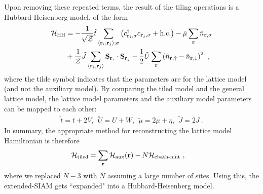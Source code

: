 \documentclass[%
 reprint,
superscriptaddress,
groupedaddress,
 amsmath,amssymb,
 aps,
prl,superscriptaddress
]{revtex4-2}
\begin{document}
Upon removing these repeated terms, the result of the tiling operations is a Hubbard-Heisenberg model, of the form
\begin{equation}\begin{aligned}
	\mathcal{H}_\text{HH} &= -\frac{1}{\sqrt\mathcal{Z}}\tilde t\sum_{\left<{\bf r}_i, {\bf r}_j\right>;\sigma}\left(c^\dagger_{{\bf r}_i,\sigma}c_{{\bf r}_j,\sigma} + \text{h.c.}\right) - \tilde \mu \sum_{{\bf r}}\hat n_{{\bf r},\sigma} \\
    &+ \frac{1}{\mathcal{Z}}\tilde J\sum_{\left< {\bf r}_i, {\bf r}_j\right>}{\bf S}_{{\bf r}_i}\cdot{\bf S}_{{\bf r}_j} - \frac{1}{2}\tilde U\sum_{\bf r}\left(\hat n_{{\bf r} , \uparrow} - \hat n_{{\bf r} , \downarrow}\right)^2  ~,
\end{aligned}\end{equation}
where the tilde symbol indicates that the parameters are for the lattice model (and not the auxiliary model). By comparing the tiled model and the general lattice model, the lattice model parameters and the auxiliary model parameters can be mapped to each other:
\begin{equation}\begin{aligned}\label{couplingsMappings}
	\tilde t = t+2V,~~ \tilde U = U + W, ~ ~ \tilde \mu = 2\mu + \eta,~ ~ \tilde J = 2J~.
\end{aligned}\end{equation}
In summary, the appropriate method for reconstructing the lattice model Hamiltonian is therefore
\begin{equation}\begin{aligned}\label{tilingPrescriptionFinal}
	\mathcal{H}_\text{tiled} &= \sum_{{\bf r}}\mathcal{H}_\text{aux}({\bf r}) - N\mathcal{H}_\text{cbath-nint}~,
\end{aligned}\end{equation}
where we replaced \(N-3\) with \(N\) assuming a large number of sites. Using this, the extended-SIAM gets ``expanded" into a Hubbard-Heisenberg model.
\end{document}
